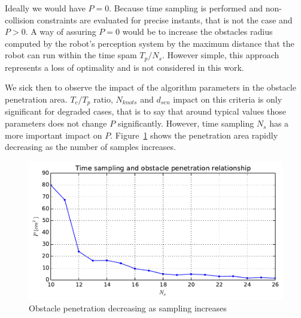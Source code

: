 \documentclass[eprint]{actapoly}
\begin{document}
Ideally we would have $P = 0$. Because time sampling is performed and non-collision 
constraints are evaluated for precise instants, that is not the case and $P>0$.
A way of assuring $P = 0$ would  be to increase the obstacles radius computed by the robot's 
perception system by the 
maximum distance that the robot can run within the time spam $T_p/N_s$. However simple,
this approach represents a loss of optimality and is not considered in this work.

We sick then to observe the impact of the algorithm parameters in the obstacle penetration
area. $T_c/T_p$ ratio, $N_{knots}$ and $d_{sen}$ impact on this criteria is only 
significant for degraded cases, that is to say that around typical values those parameters 
does not change $P$ significantly. However, time sampling $N_s$ has a more important impact
on $P$. 
Figure~\ref{fig:res} shows the penetration area rapidly decreasing as the number of samples 
increases.
\begin{figure}[!h]\centering
  \includegraphics[width=\linewidth]{./images/penetration/pen-nsi.pdf} %
  \caption{Obstacle penetration decreasing as sampling increases}
\label{fig:res}
\end{figure}
\end{document}
